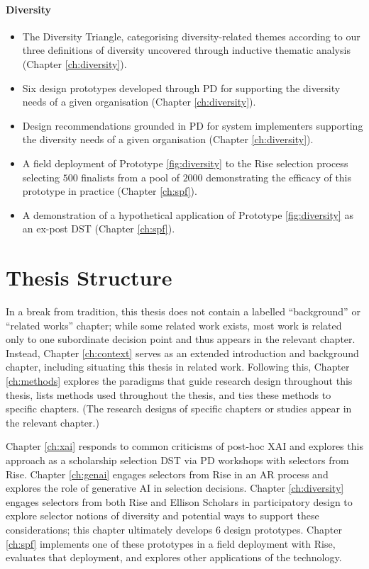 \paragraph{Diversity}
\begin{itemize}
    \item The Diversity Triangle, categorising diversity-related themes according to our three definitions of diversity uncovered through inductive thematic analysis (Chapter \ref{ch:diversity}).
    \item Six design prototypes developed through PD for supporting the diversity needs of a given organisation (Chapter \ref{ch:diversity}).
    \item Design recommendations grounded in PD for system implementers supporting the diversity needs of a given organisation (Chapter \ref{ch:diversity}).
    \item A field deployment of Prototype \ref{fig:diversity} to the Rise selection process selecting $500$ finalists from a pool of $2000$ demonstrating the efficacy of this prototype in practice (Chapter \ref{ch:spf}).
    \item A demonstration of a hypothetical application of Prototype \ref{fig:diversity} as an ex-post DST (Chapter \ref{ch:spf}).
\end{itemize}

\section{Thesis Structure}
In a break from tradition, this thesis does not contain a labelled ``background'' or ``related works'' chapter; while some related work exists, most work is related only to one subordinate decision point and thus appears in the relevant chapter. Instead, Chapter \ref{ch:context} serves as an extended introduction and background chapter, including situating this thesis in related work. Following this, Chapter \ref{ch:methods} explores the paradigms that guide research design throughout this thesis, lists methods used throughout the thesis, and ties these methods to specific chapters. (The research designs of specific chapters or studies appear in the relevant chapter.)

Chapter \ref{ch:xai} responds to common criticisms of post-hoc XAI and explores this approach as a scholarship selection DST via PD workshops with selectors from Rise. Chapter \ref{ch:genai} engages selectors from Rise in an AR process and explores the role of generative AI in selection decisions. Chapter \ref{ch:diversity} engages selectors from both Rise and Ellison Scholars in participatory design to explore selector notions of diversity and potential ways to support these considerations; this chapter ultimately develops 6 design prototypes. Chapter \ref{ch:spf} implements one of these prototypes in a field deployment with Rise, evaluates that deployment, and explores other applications of the technology.

